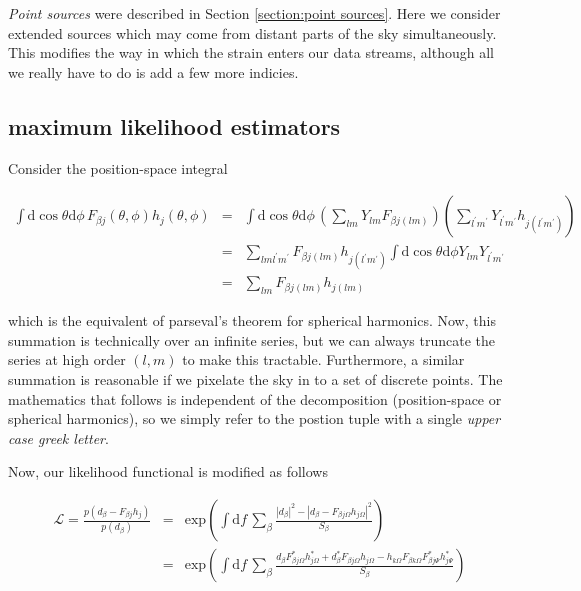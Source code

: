 \documentclass[10pt]{article}
\begin{document}
\emph{Point sources} were described in Section \ref{section:point sources}. Here we consider extended sources which may come from distant parts of the sky simultaneously. This modifies the way in which the strain enters our data streams, although all we really have to do is add a few more indicies. 

\subsection{maximum likelihood estimators}

Consider the position-space integral

\begin{eqnarray}
\int \mathrm{d}\cos\theta \mathrm{d}\phi\, F_{\beta j}\left(\theta,\phi\right) h_{j}\left(\theta,\phi\right) & = & \int \mathrm{d}\cos\theta \mathrm{d}\phi\, \left( \sum\limits_{lm} Y_{lm} F_{\beta j (lm)} \right) \left( \sum\limits_{l^\prime m^\prime} Y_{l^\prime m^\prime} h_{j (l^\prime m^\prime)} \right) \\
& = & \sum\limits_{l m l^\prime m^\prime} F_{\beta j (lm)}  h_{j (l^\prime m^\prime)} \int \mathrm{d}\cos\theta \mathrm{d}\phi Y_{lm} Y_{l^\prime m^\prime} \\
& = & \sum\limits_{lm} F_{\beta j (l m)} h_{j (l m)}
\end{eqnarray}

which is the equivalent of parseval's theorem for spherical harmonics. Now, this summation is technically over an infinite series, but we can always truncate the series at high order $(l,m)$ to make this tractable. Furthermore, a similar summation is reasonable if we pixelate the sky in
to a set of discrete points. The mathematics that follows is independent of the decomposition (position-space or spherical harmonics), so we simply refer to the postion tuple with a single \emph{upper case greek letter}.


Now, our likelihood functional is modified as follows

\begin{eqnarray}
\mathcal{L} = \frac{p(d_\beta - F_{\beta j}h_j)}{p(d_\beta)} & = & \mathrm{exp}\left(\int\mathrm{d}f\, \sum_\beta \frac{\left|d_\beta\right|^2 - \left|d_\beta - F_{\beta j \Omega}h_{j \Omega}\right|^2}{S_\beta} \right) \\
                                              & = & \mathrm{exp}\left(\int\mathrm{d}f\, \sum_\beta \frac{d_\beta F_{\beta j \Omega}^\ast h_{j \Omega}^\ast + d_\beta^\ast F_{\beta j \Omega}h_{j \Omega} - h_{k \Omega} F_{\beta k \Omega} F_{\beta j \Psi}^\ast h_{j \Psi}^\ast}{S_\beta} \right)
\end{eqnarray}
\end{document}

